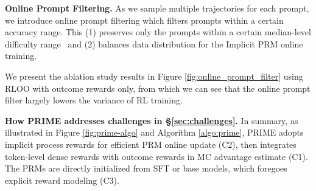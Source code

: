 \textbf{Online Prompt Filtering.}
As we sample multiple trajectories for each prompt, we introduce online prompt filtering which filters prompts within a certain accuracy range.
This (1) preserves only the prompts within a certain median-level difficulty range~\citep{yang2024qwen25mathtechnicalreportmathematical} and (2) balances data distribution for the Implicit PRM online training.

We present the ablation study results in Figure \ref{fig:online_prompt_filter} using RLOO with outcome rewards only, from which we can see that the online prompt filter largely lowers the variance of RL training. 



\textbf{How PRIME addresses challenges in \S \ref{sec:challenges}.} In summary, as illustrated in Figure \ref{fig:prime-algo} and Algorithm \ref{algo:prime}, PRIME adopts implicit process rewards for efficient PRM online update (C2), then integrates token-level dense rewards with outcome rewards in MC advantage estimate (C1). The PRMs are directly initialized from SFT or base models, which foregoes explicit reward modeling (C3). 











